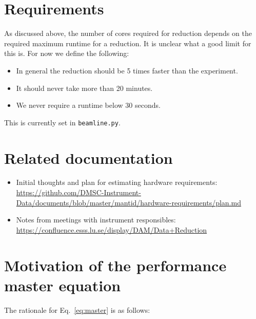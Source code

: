 \documentclass[a4paper,english,numbers=noenddot,bibliography=totoc,chapterprefix=on,DIV=12]{scrartcl}
\begin{document}
\section{Requirements}

As discussed above, the number of cores required for reduction depends on the required maximum runtime for a reduction.
It is unclear what a good limit for this is.
For now we define the following:

\begin{itemize}
  \item In general the reduction should be 5 times faster than the experiment.
  \item It should never take more than 20 minutes.
  \item We never require a runtime below 30 seconds.
\end{itemize}

This is currently set in \verb|beamline.py|.


\appendix

\section{Related documentation}

\begin{itemize}
  \item Initial thoughts and plan for estimating hardware requirements:\\
    \url{https://github.com/DMSC-Instrument-Data/documents/blob/master/mantid/hardware-requirements/plan.md}
  \item Notes from meetings with instrument responsibles:\\
    \url{https://confluence.esss.lu.se/display/DAM/Data+Reduction}
\end{itemize}

\section{Motivation of the performance master equation}
\label{app:master_eq}

The rationale for Eq.~\eqref{eq:master} is as follows:
\end{document}
